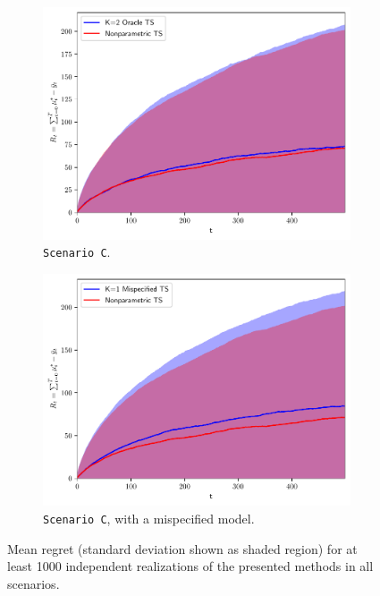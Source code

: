 \documentclass{article}
\begin{document}
\begin{figure}[!h]
	\begin{subfigure}[c]{0.49\textwidth}
		\includegraphics[width=\textwidth]{./figs/linearGaussianMixture/heavy/cumregret_R3250}
		\vspace*{-4ex}
		\caption{\texttt{Scenario C}.}
		\label{fig:linear_gaussian_mixture_heavy}
	\end{subfigure}
	\begin{subfigure}[c]{0.49\textwidth}
		\includegraphics[width=\textwidth]{./figs/linearGaussianMixture/heavy/cumregret_R3250_mispecified}
		\vspace*{-4ex}
		\caption{\texttt{Scenario C}, with a mispecified model.}
		\label{fig:linear_gaussian_mixture_mispecified}
	\end{subfigure}
	\vspace*{-1ex}
	\caption{Mean regret (standard deviation shown as shaded region) for at least 1000 independent realizations of the presented methods in all scenarios.}
	\label{fig:linear_gaussian_mixtures}
\vspace*{-1ex}
\end{figure}
\end{document}
